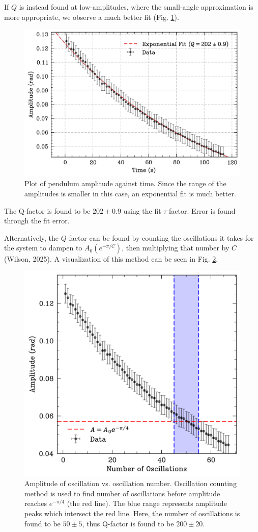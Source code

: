 \documentclass[prl,twocolumn,amsmath,amssymb,superscriptaddress]{revtex4-2}
\begin{document}
If $Q$ is instead found at low-amplitudes, where the small-angle approximation is more appropriate, we observe a much better fit (Fig. \ref{fig:decay_small_angle}).
\begin{figure}[htb]
    \includegraphics[width=0.8\linewidth]{low_angle_q.png}
    \caption{Plot of pendulum amplitude against time. Since the range of the amplitudes is smaller in this case, an exponential fit is much better.}
    \label{fig:decay_small_angle}
\end{figure}

The Q-factor is found to be $202\pm0.9$ using the fit $\tau$ factor. Error is found through the fit error.

Alternatively, the $Q$-factor can be found by counting the oscillations it takes for the system to dampen to $A_0(e^{-\pi/C})$, then multiplying that number by $C$ (Wilson, 2025). A visualization of this method can be seen in Fig. \ref{fig:count_q}.

\begin{figure}[htb]
    \hspace{-20pt}
    \includegraphics[width=0.9\linewidth]{count_decay.png}
    \caption{Amplitude of oscillation vs. oscillation number. Oscillation counting method is used to find number of oscillations before amplitude reaches $e^{-\pi/4}$ (the red line). The blue range represents amplitude peaks which intersect the red line. Here, the number of oscillations is found to be $50\pm5$, thus Q-factor is found to be $200\pm20$.}
    \label{fig:count_q}
\end{figure}
\end{document}
